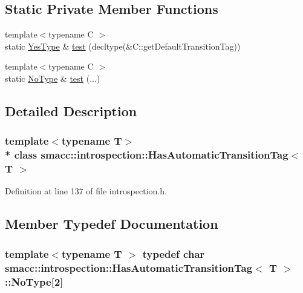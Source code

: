 \subsection*{Static Private Member Functions}
\begin{DoxyCompactItemize}
\item 
{\footnotesize template$<$typename C $>$ }\\static \hyperlink{classsmacc_1_1introspection_1_1HasAutomaticTransitionTag_a750a08a185de0fa20331ba7cfc531dde}{Yes\+Type} \& \hyperlink{classsmacc_1_1introspection_1_1HasAutomaticTransitionTag_a9de2266c38ff1f570674289f32b0faaf}{test} (decltype(\&C\+::get\+Default\+Transition\+Tag))
\item 
{\footnotesize template$<$typename C $>$ }\\static \hyperlink{classsmacc_1_1introspection_1_1HasAutomaticTransitionTag_ab81e7f76862ba064df3fd8e78b3864c4}{No\+Type} \& \hyperlink{classsmacc_1_1introspection_1_1HasAutomaticTransitionTag_aa38a947c16db7a23eefa754ba2c90782}{test} (...)
\end{DoxyCompactItemize}


\subsection{Detailed Description}
\subsubsection*{template$<$typename T$>$\\*
class smacc\+::introspection\+::\+Has\+Automatic\+Transition\+Tag$<$ T $>$}



Definition at line 137 of file introspection.\+h.



\subsection{Member Typedef Documentation}
\subsubsection[{\texorpdfstring{No\+Type}{NoType}}]{\setlength{\rightskip}{0pt plus 5cm}template$<$typename T $>$ typedef char {\bf smacc\+::introspection\+::\+Has\+Automatic\+Transition\+Tag}$<$ T $>$\+::No\+Type\mbox{[}2\mbox{]}\hspace{0.3cm}{\ttfamily [private]}}\hypertarget{classsmacc_1_1introspection_1_1HasAutomaticTransitionTag_ab81e7f76862ba064df3fd8e78b3864c4}{}\label{classsmacc_1_1introspection_1_1HasAutomaticTransitionTag_ab81e7f76862ba064df3fd8e78b3864c4}


